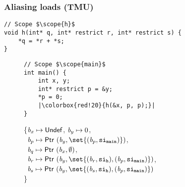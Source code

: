 \begin{frame}[fragile]
\frametitle{Aliasing loads (TMU)}
\begin{verbatim}
// Scope $\scope{h}$
void h(int* q, int* restrict r, int* restrict s) {
    *q = *r + *s; 
}
\end{verbatim}
\vspace*{-1cm}
\begin{figure}[h]
\centering
\begin{minipage}{.36\textwidth}
\begin{verbatim}
// Scope $\scope{main}$
int main() {
    int x, y;
    int* restrict p = &y;
    *p = 0;
    |\colorbox{red!20}{h(&x, p, p);}|
}
\end{verbatim}
\end{minipage}%
\begin{minipage}{.64\textwidth}
\executionannotation
{
\{$\textit{b}_x \mapsto \mathsf{Undef}$, $\textit{b}_y \mapsto 0$, \\
    \ $\Blockvar_p \mapsto \ptr{(\Blockvar_y, \set{(\Blockvar_p, \scope{main})})}$, \\
    \ \colorbox{red!20}{$\textit{b}_q \mapsto \mathsf{Ptr} \ (\textit{b}_x, \emptyset)$}, \\
    \ \colorbox{red!20}{$\Blockvar_r \mapsto \ptr{(\Blockvar_y, \set{(\Blockvar_r, \scope{h}), (\Blockvar_p, \scope{main})})} $}, \\
    \ \colorbox{red!20}{$\Blockvar_s \mapsto \ptr{(\Blockvar_y, \set{(\Blockvar_s, \scope{h}), (\Blockvar_p, \scope{main})})} $} \\
\}
}
{
}
\end{minipage}
\end{figure}

\end{frame}





